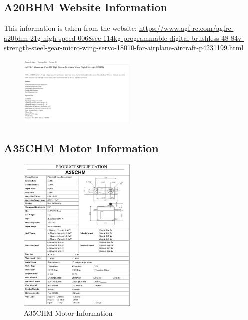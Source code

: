 \subsection{A20BHM Website Information}
\label{appendix:A20_info}

This information is taken from the website: \url{https://www.agf-rc.com/agfrc-a20bhm-21g-high-speed-0068sec-114kg-programmable-digital-brushless-48-84v-strength-steel-gear-micro-wing-servo-18010-for-airplane-aircraft-p4231199.html}
\begin{figure}[H]
    \centering
    \includegraphics[width=0.5\textwidth]{Images/A20_info.png}
    \label{fig:A20_info}
\end{figure}

\subsection{A35CHM Motor Information}
\label{appendix:A35CHM_motor_info}

\begin{figure}[H]
    \centering
    \includegraphics[width=0.5\textwidth]{Images/A35CHM_info.png}
    \caption{A35CHM Motor Information}
    \label{fig:A35CHM_info}
\end{figure}
